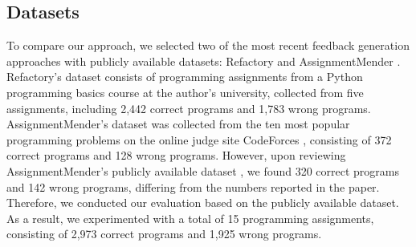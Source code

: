 \documentclass[10pt,conference]{IEEEtran}
\begin{document}
    \subsection{Datasets}
        To compare our approach, we selected two of the most recent feedback generation approaches with publicly available datasets: Refactory \cite{hu2019re} and AssignmentMender \cite{li2022generating}. Refactory's dataset consists of programming assignments from a Python programming basics course at the author's university, collected from five assignments, including 2,442 correct programs and 1,783 wrong programs. AssignmentMender's dataset was collected from the ten most popular programming problems on the online judge site CodeForces \cite{codeforcesCodeforces}, consisting of 372 correct programs and 128 wrong programs. However, upon reviewing AssignmentMender's publicly available dataset \cite{ExperimentTask}, we found 320 correct programs and 142 wrong programs, differing from the numbers reported in the paper. Therefore, we conducted our evaluation based on the publicly available dataset. As a result, we experimented with a total of 15 programming assignments, consisting of 2,973 correct programs and 1,925 wrong programs.
\end{document}
